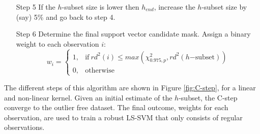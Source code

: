 \documentclass[preprint,12pt]{elsarticle}
\begin{document}
\begin{itemize}
		\item [Step 5] If the $h$-subset size is lower then $h_{end}$, increase the $h$-subset size by (say) 5\% and go back to step 4. 
		\item [Step 6] Determine the final support vector candidate mask. Assign a binary weight to each observation $i$:
		\begin{equation}
		w_i =
		\begin{cases}
		1, & \text{if}\ rd^2(i) \leq max(\chi^2_{0.975, p}, rd^2(h\mathrm{-subset})) \\
		0, & \text{otherwise}
		\end{cases}
		\end{equation}
	\end{itemize}
	The different steps of this algorithm are shown in Figure \ref{fig:C-step}, for a linear and non-linear kernel. Given an initial estimate of the $h$-subset, the C-step converge to the outlier free dataset. The final outcome, weights for each observation, are used to train a robust LS-SVM that only consists of regular observations.
	
\end{document}
